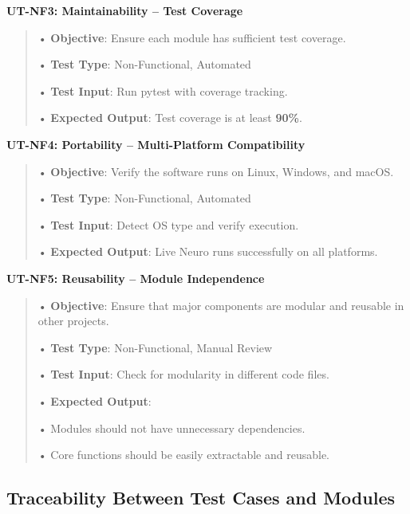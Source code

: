 \documentclass[
]{article}
\begin{document}
\textbf{UT-NF3: Maintainability -- Test Coverage}

\begin{quote}
• \textbf{Objective}: Ensure each module has sufficient test coverage.

• \textbf{Test Type}: Non-Functional, Automated

• \textbf{Test Input}: Run pytest with coverage tracking.

• \textbf{Expected Output}: Test coverage is at least \textbf{90\%}.
\end{quote}

\textbf{UT-NF4: Portability -- Multi-Platform Compatibility}

\begin{quote}
• \textbf{Objective}: Verify the software runs on Linux, Windows, and
macOS.

• \textbf{Test Type}: Non-Functional, Automated

• \textbf{Test Input}: Detect OS type and verify execution.

• \textbf{Expected Output}: Live Neuro runs successfully on all
platforms.
\end{quote}

\textbf{UT-NF5: Reusability -- Module Independence}

\begin{quote}
• \textbf{Objective}: Ensure that major components are modular and
reusable in other projects.

• \textbf{Test Type}: Non-Functional, Manual Review

• \textbf{Test Input}: Check for modularity in different code files.

• \textbf{Expected Output}:

• Modules should not have unnecessary dependencies.

• Core functions should be easily extractable and reusable.
\end{quote}

\hypertarget{traceability-between-test-cases-and-modules}{%
\subsection{Traceability Between Test Cases and
Modules}\label{traceability-between-test-cases-and-modules}}
\end{document}
